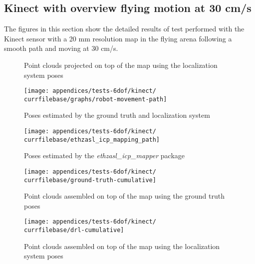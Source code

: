 \subsection{Kinect with overview flying motion at 30 cm/s}

The figures in this section show the detailed results of test performed with the Kinect sensor with a 20 mm resolution map in the flying arena following a smooth path and moving at 30 cm/s.


\begin{figure}[H]
	\centering
	\caption{Point clouds projected on top of the map using the localization system poses}
\end{figure}

\begin{figure}[H]
	\centering
	\begin{minipage}[h]{0.497\textwidth}
		\centering
		\texttt{[image: appendices/tests-6dof/kinect/\\currfilebase/graphs/robot-movement-path]}
		\caption{Poses estimated by the ground truth and localization system}
		\label{fig:localization-system-evaluation_kinect_translation_path}
	\end{minipage}\hfill
	\begin{minipage}[h]{0.497\textwidth}
		\centering
		\texttt{[image: appendices/tests-6dof/kinect/\\currfilebase/ethzasl\_icp\_mapping\_path]}
		\caption{Poses estimated by the \emph{ethzasl\_icp\_mapper} package \cite{Pomerleau2011}}
		\label{fig:localization-system-evaluation_kinect_translation_path2}
	\end{minipage}
\end{figure}


\begin{figure}[H]
	\centering
	\texttt{[image: appendices/tests-6dof/kinect/\\currfilebase/ground-truth-cumulative]}
	\caption{Point clouds assembled on top of the map using the ground truth poses}
\end{figure}

\begin{figure}[H]
	\centering
	\texttt{[image: appendices/tests-6dof/kinect/\\currfilebase/drl-cumulative]}
	\caption{Point clouds assembled on top of the map using the localization system poses}
\end{figure}


